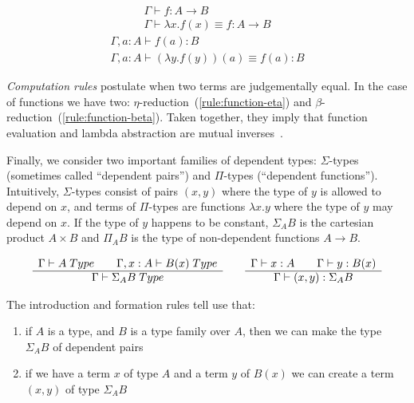 \begin{equation}
  \begin{array}{c}
    \Gamma \vdash f : A \rightarrow B\\
    \hline
    \Gamma \vdash \lambda x. f(x) \equiv f : A \rightarrow B
  \end{array}
  \label{rule:function-eta}
\end{equation}
\begin{equation}
  \begin{array}{c}
    \Gamma, a : A \vdash f(a) : B\\
    \hline
    \Gamma, a : A \vdash (\lambda y . f(y))(a) \equiv f(a) : B
  \end{array}
  \label{rule:function-beta}
\end{equation}

\emph{Computation rules} postulate when two terms are judgementally equal. In
the case of functions we have two: $\eta$-reduction~(\ref{rule:function-eta})
and $\beta$-reduction~(\ref{rule:function-beta}). Taken together, they imply that
function evaluation and lambda abstraction are mutual inverses~\cite{Rijke2019}.

Finally, we consider two important families of dependent types: $\Sigma$-types
(sometimes called ``dependent pairs'') and $\Pi$-types (``dependent
functions''). Intuitively, $\Sigma$-types consist of pairs $(x,y)$ where the
type of $y$ is allowed to depend on $x$, and terms of $\Pi$-types are functions
$\lambda x . y$ where the type of $y$ may depend on $x$. If the type of $y$
happens to be constant, $\Sigma_A B$ is the cartesian product $A \times B$ and
$\Pi_A B$ is the type of non-dependent functions $A \rightarrow B$.

\begin{equation*}
  \begin{array}[t]{c}
    \Gamma \vdash A \; Type \qquad \Gamma, x:A \vdash B(x) \; Type\\
    \hline
    \Gamma \vdash \Sigma_A B \; Type\\
  \end{array}
  \qquad
  \begin{array}[t]{c}
    \Gamma \vdash x:A \qquad \Gamma \vdash y : B(x)\\
    \hline
    \Gamma \vdash (x , y) : \Sigma_A B
  \end{array}
\end{equation*}

The introduction and formation rules tell use that: 
\begin{enumerate}
\item if $A$ is a type, and $B$ is a type family over $A$,
  then we can make the type $\Sigma_A B$ of dependent pairs
\item if we have a term $x$ of type $A$ and a term $y$ of $B(x)$ we can create
    a term $(x,y)$ of type $\Sigma_A B$
\end{enumerate}

